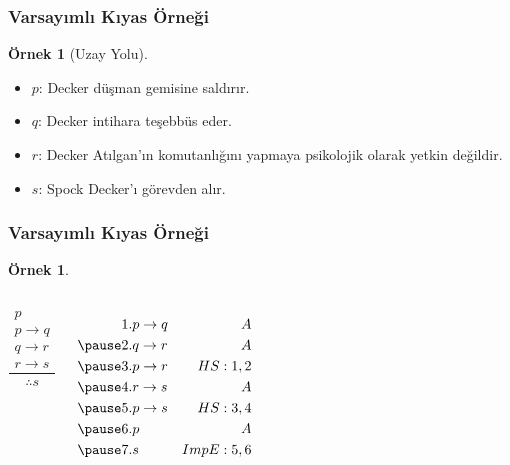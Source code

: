 \documentclass[dvipsnames]{beamer}
\theoremstyle{definition}
\theoremstyle{example}
\newtheorem{ornek}[theorem]{Örnek}
\theoremstyle{plain}
\begin{document}
\begin{frame}
  \frametitle{Varsayımlı Kıyas Örneği}

  \begin{ornek}[Uzay Yolu]
    \begin{itemize}
      \item $p$: Decker düşman gemisine saldırır.
      \item $q$: Decker intihara teşebbüs eder.
      \item $r$: Decker Atılgan'ın komutanlığını yapmaya psikolojik olarak
        yetkin değildir.
      \item $s$: Spock Decker'ı görevden alır.
    \end{itemize}
  \end{ornek}
\end{frame}

\begin{frame}
  \frametitle{Varsayımlı Kıyas Örneği}

  \begin{ornek}
    \begin{columns}
      \[
      \frac
        {
          \begin{array}{c}
            p\\
            p \rightarrow q\\
            q \rightarrow r\\
            r \rightarrow s
          \end{array}
        }
        {
          \therefore s
        }
      \]

      \pause
      \begin{eqnarray*}
        1. & p \rightarrow q & A\\
        \pause
        2. & q \rightarrow r & A\\
        \pause
        3. & p \rightarrow r & HS:1,2\\
        \pause
        4. & r \rightarrow s & A\\
        \pause
        5. & p \rightarrow s & HS:3,4\\
        \pause
        6. & p               & A\\
        \pause
        7. & s               & ImpE:5,6
      \end{eqnarray*}
    \end{columns}
  \end{ornek}
\end{frame}
\end{document}
